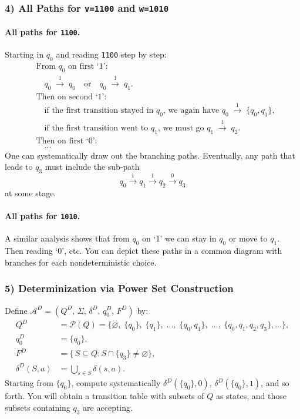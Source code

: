 \documentclass{article}
\theoremstyle{theorem}
\theoremstyle{definition}
\theoremstyle{remark}
\begin{document}
\subsubsection*{4) All Paths for \texttt{v=1100} and \texttt{w=1010}}

\paragraph{All paths for \texttt{1100}.}
Starting in $q_0$ and reading \texttt{1100} step by step:
\[
\begin{aligned}
&\text{From }q_0\text{ on first `1':}\\
&\quad q_0 \;\xrightarrow{1}\; q_0 \quad\text{or}\quad q_0 \;\xrightarrow{1}\; q_1.\\[6pt]
&\text{Then on second `1':}\\
&\quad \text{if the first transition stayed in }q_0\text{, we again have }q_0 \;\xrightarrow{1}\; \{q_0,q_1\},\\
&\quad \text{if the first transition went to }q_1\text{, we must go }q_1 \;\xrightarrow{1}\; q_2.\\[6pt]
&\text{Then on first `0':}\\
&\quad \dots 
\end{aligned}
\]
One can systematically draw out the branching paths.  Eventually, any path that leads to $q_3$ must include the sub-path 
\[
q_0 \xrightarrow{1} q_1 \xrightarrow{1} q_2 \xrightarrow{0} q_3
\]
at some stage.

\paragraph{All paths for \texttt{1010}.}
A similar analysis shows that from $q_0$ on `1' we can stay in $q_0$ or move to $q_1$.  Then reading `0', etc.  You can depict these paths in a common diagram with branches for each nondeterministic choice.

\newpage

\subsubsection*{5) Determinization via Power Set Construction}
Define $\mathcal{A}^D = (Q^D,\,\Sigma,\,\delta^D,\,q_0^D,\,F^D)$ by:
\[
\begin{aligned}
Q^D &= \mathcal{P}(Q) = \{\varnothing,\;\{q_0\},\;\{q_1\},\;\dots,\;\{q_0,q_1\},\;\dots,\;\{q_0,q_1,q_2,q_3\},\dots\},\\
q_0^D &= \{q_0\},\\
F^D &= \{\,S \subseteq Q : S \cap \{q_3\} \neq \varnothing\},\\
\delta^D(S, a) &= \bigcup_{s \in S} \delta(s,a).
\end{aligned}
\]
Starting from $\{q_0\}$, compute systematically $\delta^D(\{q_0\},0)$, $\delta^D(\{q_0\},1)$, and so forth.  You will obtain a transition table with subsets of $Q$ as states, and those subsets containing $q_3$ are accepting.
\end{document}
